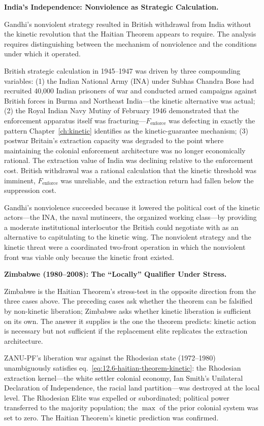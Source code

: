 \textbf{India's Independence: Nonviolence as Strategic Calculation.}

Gandhi's nonviolent strategy resulted in British withdrawal from India without the kinetic revolution that the Haitian Theorem appears to require. The analysis requires distinguishing between the mechanism of nonviolence and the conditions under which it operated.

British strategic calculation in 1945--1947 was driven by three compounding variables: (1) the Indian National Army (INA) under Subhas Chandra Bose had recruited 40,000 Indian prisoners of war and conducted armed campaigns against British forces in Burma and Northeast India---the kinetic alternative was actual; (2) the Royal Indian Navy Mutiny of February 1946 demonstrated that the enforcement apparatus itself was fracturing---$F_{\text{enforce}}$ was defecting in exactly the pattern Chapter~\ref{ch:kinetic} identifies as the kinetic-guarantee mechanism; (3) postwar Britain's extraction capacity was degraded to the point where maintaining the colonial enforcement architecture was no longer economically rational. The extraction value of India was declining relative to the enforcement cost. British withdrawal was a rational calculation that the kinetic threshold was imminent, $F_{\text{enforce}}$ was unreliable, and the extraction return had fallen below the suppression cost.

Gandhi's nonviolence succeeded because it lowered the political cost of the kinetic actors---the INA, the naval mutineers, the organized working class---by providing a moderate institutional interlocutor the British could negotiate with as an alternative to capitulating to the kinetic wing. The nonviolent strategy and the kinetic threat were a coordinated two-front operation in which the nonviolent front was viable only because the kinetic front existed.

\textbf{Zimbabwe (1980--2008): The ``Locally'' Qualifier Under Stress.}

Zimbabwe is the Haitian Theorem's stress-test in the opposite direction from the three cases above. The preceding cases ask whether the theorem can be falsified by non-kinetic liberation; Zimbabwe asks whether kinetic liberation is sufficient on its own. The answer it supplies is the one the theorem predicts: kinetic action is necessary but not sufficient if the replacement elite replicates the extraction architecture.

ZANU-PF's liberation war against the Rhodesian state (1972--1980) unambiguously satisfies eq.~\ref{eq:12.6-haitian-theorem-kinetic}: the Rhodesian extraction kernel---the white settler colonial economy, Ian Smith's Unilateral Declaration of Independence, the racial land partition---was destroyed at the local level. The Rhodesian Elite was expelled or subordinated; political power transferred to the majority population; the $\max$ of the prior colonial system was set to zero. The Haitian Theorem's kinetic prediction was confirmed.

